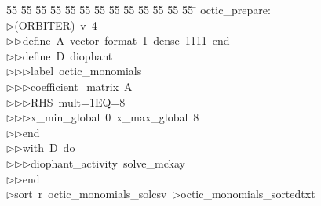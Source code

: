 %
%
\begin{tabbing}
55 \= 55 \= 55 \= 55 \= 55 \= 55 \= 55 \= 55 \= 55 \= 55 \= 55 \= 55 \= 55 \= \kill
octic\_prepare:\\[0pt]
$\triangleright$\>(ORBITER)\ v\ 4\ \\[0pt]
$\triangleright$\>$\triangleright$\>define\ A\ vector\ format\ 1\ dense\ 1111\ end\ \\[0pt]
$\triangleright$\>$\triangleright$\>define\ D\ diophant\ \\[0pt]
$\triangleright$\>$\triangleright$\>$\triangleright$\>label\ octic\_monomials\ \\[0pt]
$\triangleright$\>$\triangleright$\>$\triangleright$\>coefficient\_matrix\ A\ \\[0pt]
$\triangleright$\>$\triangleright$\>$\triangleright$\>RHS\ mult=1EQ=8\ \\[0pt]
$\triangleright$\>$\triangleright$\>$\triangleright$\>x\_min\_global\ 0\ x\_max\_global\ 8\ \\[0pt]
$\triangleright$\>$\triangleright$\>end\ \\[0pt]
$\triangleright$\>$\triangleright$\>with\ D\ do\ \\[0pt]
$\triangleright$\>$\triangleright$\>$\triangleright$\>diophant\_activity\ solve\_mckay\ \\[0pt]
$\triangleright$\>$\triangleright$\>end\\[0pt]
$\triangleright$\>sort\ r\ octic\_monomials\_solcsv\ {\textgreater}octic\_monomials\_sortedtxt\\[0pt]
\end{tabbing}
